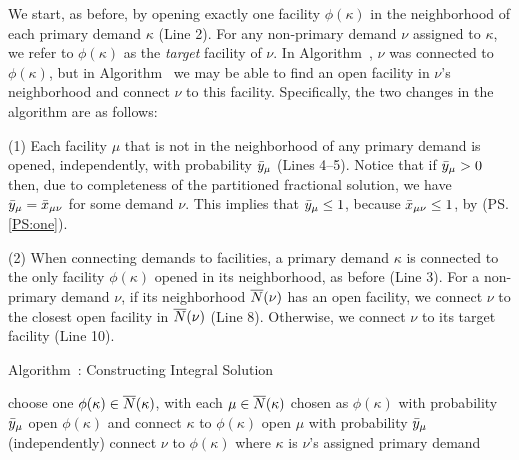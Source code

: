 \documentclass[oneside,final]{ucr}
\begin{document}
We start, as before, by opening exactly one facility $\phi(\kappa)$ in the 
neighborhood of each primary demand $\kappa$ (Line 2).  For any
non-primary demand $\nu$ assigned to $\kappa$, we refer to
$\phi(\kappa)$ as the \emph{target} facility of $\nu$.  In
Algorithm~{\EGUP}, $\nu$ was connected to $\phi(\kappa)$,
but in Algorithm~{\ECHS} we may be able to find an open
facility in $\nu$'s neighborhood and connect $\nu$ to this
facility.  Specifically, the two changes in the
algorithm are as follows:
%
\begin{description}
\item{(1)} Each facility $\mu$ that is not in the neighborhood of any
  primary demand is opened, independently, with probability
  ${\bar y}_{\mu}$ (Lines 4--5). Notice that if ${\bar y}_\mu>0$ then, due
  to completeness of the partitioned fractional solution, we have
  ${\bar y}_{\mu}= {\bar x}_{\mu\nu}$ for some demand $\nu$. This implies
  that ${\bar y}_{\mu}\leq 1$, because ${\bar x}_{\mu\nu}\le 1$, by
  (PS.\ref{PS:one}).
%
\item{(2)} When connecting demands to facilities, a primary demand
  $\kappa$ is connected to the only facility $\phi(\kappa)$ opened in
  its neighborhood, as before (Line 3).  For a non-primary demand
  $\nu$, if its neighborhood ${\overline{N}}(\nu)$ has an open facility, we
  connect $\nu$ to the closest open facility in ${\overline{N}}(\nu)$ (Line
  8). Otherwise, we connect $\nu$ to its target facility (Line 10).
%
\end{description}


\begin{algorithm}
  \caption{Algorithm~{\ECHS}:
    Constructing Integral Solution}
  \label{alg:lpr3}
  \begin{algorithmic}[1]
    \State choose one $\phi(\kappa)\in {\overline{N}}(\kappa)$,
    with each $\mu\in{\overline{N}}(\kappa)$ chosen as $\phi(\kappa)$
    with probability ${\bar y}_\mu$ 
    \State open $\phi(\kappa)$ and connect $\kappa$ to $\phi(\kappa)$
    \EndFor
    \State open $\mu$ with probability ${\bar y}_\mu$ (independently)
    \EndFor
    \Else
    \State connect $\nu$ to $\phi(\kappa)$ where $\kappa$ is $\nu$'s
     assigned primary demand
    \EndIf
    \EndFor
  \end{algorithmic}
\end{algorithm}
\end{document}
